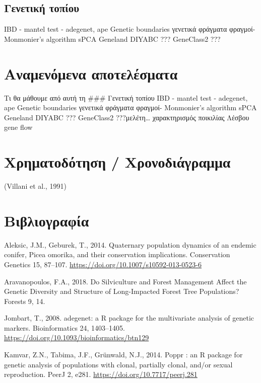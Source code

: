 \documentclass[12pt,a4paper,]{report}
\begin{document}
\hypertarget{-}{%
\subsection{Γενετική τοπίου}\label{-}}

IBD - mantel test - adegenet, ape Genetic boundaries γενετικά φράγματα
φραγμοί- Monmonier's algorithm sPCA Geneland DIYABC ??? GeneClass2 ???

\hypertarget{-}{%
\section{Αναμενόμενα αποτελέσματα}\label{-}}

Τι θα μάθουμε από αυτή τη \#\#\# Γενετική τοπίου IBD - mantel test -
adegenet, ape Genetic boundaries γενετικά φράγματα φραγμοί- Monmonier's
algorithm sPCA Geneland DIYABC ??? GeneClass2 ???μελέτη\ldots{}
χαρακτηρισμός ποικιλίας Λέσβου gene flow

\hypertarget{-}{%
\section{Χρηματοδότηση / Χρονοδιάγραμμα}\label{-}}

(Villani et al., 1991)

\section{Βιβλιογραφία}

\hypertarget{refs}{}
\leavevmode\hypertarget{ref-Aleksic2014}{}%
Aleksic, J.M., Geburek, T., 2014. Quaternary population dynamics of an
endemic conifer, Picea omorika, and their conservation implications.
Conservation Genetics 15, 87--107.
\url{https://doi.org/10.1007/s10592-013-0523-6}

\leavevmode\hypertarget{ref-Aravanopoulos2018a}{}%
Aravanopoulos, F.A., 2018. Do Silviculture and Forest Management Affect
the Genetic Diversity and Structure of Long-Impacted Forest Tree
Populations? Forests 9, 14.

\leavevmode\hypertarget{ref-Jombart2008}{}%
Jombart, T., 2008. adegenet: a R package for the multivariate analysis
of genetic markers. Bioinformatics 24, 1403--1405.
\url{https://doi.org/10.1093/bioinformatics/btn129}

\leavevmode\hypertarget{ref-Kamvar2014}{}%
Kamvar, Z.N., Tabima, J.F., Grünwald, N.J., 2014. Poppr : an R package
for genetic analysis of populations with clonal, partially clonal,
and/or sexual reproduction. PeerJ 2, e281.
\url{https://doi.org/10.7717/peerj.281}
\end{document}
